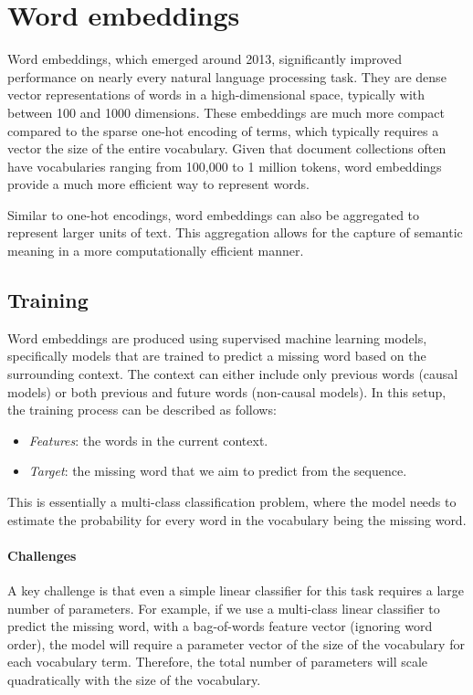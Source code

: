 \section{Word embeddings}

Word embeddings, which emerged around 2013, significantly improved performance on nearly every natural language processing task.
They are dense vector representations of words in a high-dimensional space, typically with between 100 and 1000 dimensions. 
These embeddings are much more compact compared to the sparse one-hot encoding of terms, which typically requires a vector the size of the entire vocabulary.
Given that document collections often have vocabularies ranging from 100,000 to 1 million tokens, word embeddings provide a much more efficient way to represent words.

Similar to one-hot encodings, word embeddings can also be aggregated to represent larger units of text. 
This aggregation allows for the capture of semantic meaning in a more computationally efficient manner.

\subsection{Training}
Word embeddings are produced using supervised machine learning models, specifically models that are trained to predict a missing word based on the surrounding context.
The context can either include only previous words (causal models) or both previous and future words (non-causal models).
In this setup, the training process can be described as follows:
\begin{itemize}
    \item \textit{Features}: the words in the current context.
    \item \textit{Target}: the missing word that we aim to predict from the sequence.
\end{itemize}
\noindent This is essentially a multi-class classification problem, where the model needs to estimate the probability for every word in the vocabulary being the missing word.

\paragraph*{Challenges}
A key challenge is that even a simple linear classifier for this task requires a large number of parameters.
For example, if we use a multi-class linear classifier to predict the missing word, with a bag-of-words feature vector (ignoring word order), the model will require a parameter vector of the size of the vocabulary for each vocabulary term. 
Therefore, the total number of parameters will scale quadratically with the size of the vocabulary.

